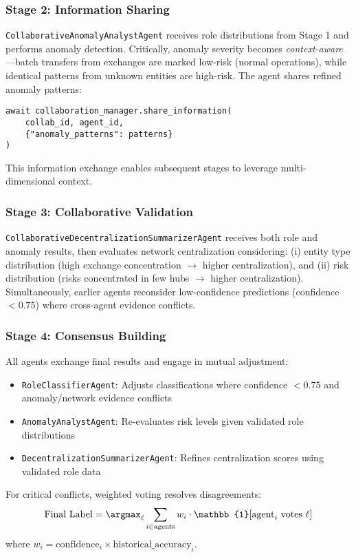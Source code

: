 \documentclass[conference]{IEEEtran}
\begin{document}
\subsubsection{Stage 2: Information Sharing}
\texttt{CollaborativeAnomalyAnalystAgent} receives role distributions from Stage 1 and performs anomaly detection. Critically, anomaly severity becomes \textit{context-aware}---batch transfers from exchanges are marked low-risk (normal operations), while identical patterns from unknown entities are high-risk. The agent shares refined anomaly patterns:
\begin{verbatim}
await collaboration_manager.share_information(
    collab_id, agent_id, 
    {"anomaly_patterns": patterns}
)
\end{verbatim}
This information exchange enables subsequent stages to leverage multi-dimensional context.

\subsubsection{Stage 3: Collaborative Validation}
\texttt{CollaborativeDecentralizationSummarizerAgent} receives both role and anomaly results, then evaluates network centralization considering: (i) entity type distribution (high exchange concentration $\rightarrow$ higher centralization), and (ii) risk distribution (risks concentrated in few hubs $\rightarrow$ higher centralization). Simultaneously, earlier agents reconsider low-confidence predictions (confidence $< 0.75$) where cross-agent evidence conflicts.

\subsubsection{Stage 4: Consensus Building}
All agents exchange final results and engage in mutual adjustment:
\begin{itemize}
    \item \texttt{RoleClassifierAgent}: Adjusts classifications where confidence $< 0.75$ and anomaly/network evidence conflicts
    \item \texttt{AnomalyAnalystAgent}: Re-evaluates risk levels given validated role distributions  
    \item \texttt{DecentralizationSummarizerAgent}: Refines centralization scores using validated role data
\end{itemize}

For critical conflicts, weighted voting resolves disagreements:
\begin{equation}
\text{Final Label} = \argmax_{\ell} \sum_{i \in \text{agents}} w_i \cdot \mathbb{1}[\text{agent}_i \text{ votes } \ell]
\end{equation}
where $w_i = \text{confidence}_i \times \text{historical\_accuracy}_i$.
\end{document}
